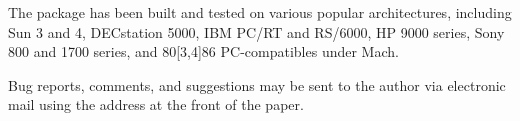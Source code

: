\documentclass[fullpage,11pt]{article}
\begin{document}
The package has been built and tested on various popular architectures,
including Sun 3 and 4, DECstation 5000, IBM PC/RT and RS/6000, HP 9000 series,
Sony 800 and 1700 series, and 80[3,4]86 PC-compatibles under Mach.

Bug reports, comments, and suggestions may be sent to the author via
electronic mail using the address at the front of the paper.
\end{document}
